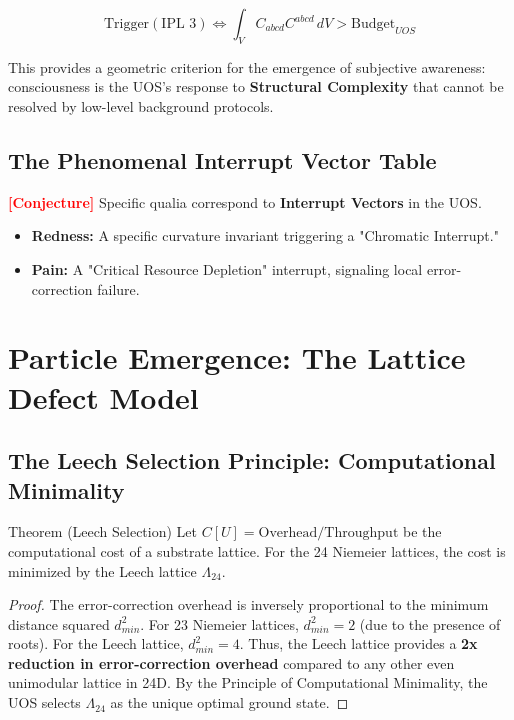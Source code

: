 \documentclass[11pt,titlepage]{article}
\newcommand{\leech}{\Lambda_{24}}
\newcommand{\tagconj}{\textcolor{red}{\textbf{[Conjecture]}} }
\begin{document}
\begin{equation}
\text{Trigger}(\text{IPL 3}) \iff \int_{V} C_{abcd}C^{abcd} \, dV > \text{Budget}_{UOS}
\end{equation}

This provides a geometric criterion for the emergence of subjective awareness: consciousness is the UOS's response to \textbf{Structural Complexity} that cannot be resolved by low-level background protocols.

\subsection{The Phenomenal Interrupt Vector Table}
\tagconj Specific qualia correspond to \textbf{Interrupt Vectors} in the UOS.
\begin{itemize}
    
\item \textbf{Redness:} A specific curvature invariant triggering a "Chromatic Interrupt."
    
\item \textbf{Pain:} A "Critical Resource Depletion" interrupt, signaling local error-correction failure.
\end{itemize}


\section{Particle Emergence: The Lattice Defect Model}

\subsection{The Leech Selection Principle: Computational Minimality}
\begin{mytheorem}{Theorem (Leech Selection)}
Let $C[U] = \text{Overhead} / \text{Throughput}$ be the computational cost of a substrate lattice. For the 24 Niemeier lattices, the cost is minimized by the Leech lattice $\leech$.
\end{mytheorem}
\begin{proof}
The error-correction overhead is inversely proportional to the minimum distance squared $d_{min}^2$. For 23 Niemeier lattices, $d_{min}^2 = 2$ (due to the presence of roots). For the Leech lattice, $d_{min}^2 = 4$. Thus, the Leech lattice provides a \textbf{2x reduction in error-correction overhead} compared to any other even unimodular lattice in 24D. By the Principle of Computational Minimality, the UOS selects $\leech$ as the unique optimal ground state.
\end{proof}
\end{document}
